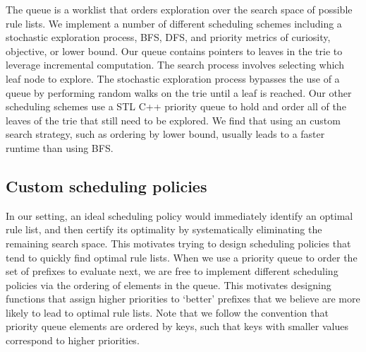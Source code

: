 The queue is a worklist that orders exploration over the search space of possible rule lists.
We implement a number of different scheduling schemes including a stochastic exploration process, BFS, DFS, and priority metrics of curiosity, objective, or lower bound.
Our queue contains pointers to leaves in the trie to leverage incremental computation.
The search process involves selecting which leaf node to explore.
The stochastic exploration process bypasses the use of a queue by performing random walks on the trie until a leaf is reached.
Our other scheduling schemes use a STL C++ priority queue to hold and order all of the leaves of the trie that still need to be explored.
We find that using an custom search strategy, such as ordering by lower bound, usually leads to a faster runtime than using BFS.

\subsection{Custom scheduling policies}
\label{sec:scheduling}

In our setting, an ideal scheduling policy would immediately identify an optimal
rule list, and then certify its optimality by systematically eliminating the
remaining search space.
%
This motivates trying to design scheduling policies that tend to quickly find optimal rule lists.
%
When we use a priority queue to order the set of prefixes to evaluate next,
we are free to implement different scheduling policies via the ordering of
elements in the queue.
%
This motivates designing functions that assign higher priorities to `better'
prefixes that we believe are more likely to lead to optimal rule lists.
%
Note that we follow the convention that priority queue elements are ordered
by keys, such that keys with smaller values correspond to higher priorities.


